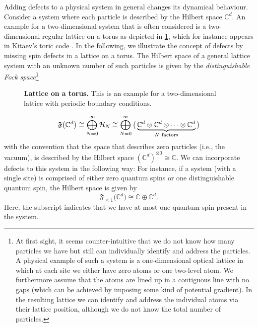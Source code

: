 Adding defects to a physical system in general changes its dynamical behaviour. Consider a system where each particle is described by the Hilbert space $\mathbb{C}^d$. An example for a two-dimensional system that is often considered is a two-dimensional regular lattice on a torus as depicted in \cref{fig:torus}, which for instance appears in Kitaev's toric code \cite{Kitaev2003}. In the following, we illustrate the concept of defects by missing spin defects in a lattice on a torus. The Hilbert space of a general lattice system with an unknown number of such particles is given by the \emph{distinguishable Fock space}\footnote{At first sight, it seems counter-intuitive that we do not know how many particles we have but still can individually identify and address the particles. A physical example of such a system is a one-dimensional optical lattice in which at each site we either have zero atoms or one two-level atom. We furthermore assume that the atoms are lined up in a contiguous line with no gaps (which can be achieved by imposing some kind of potential gradient). In the resulting lattice we can identify and address the individual atoms via their lattice position, although we do not know the total number of particles.}

\begin{figure}[t]
	\centering
	\caption{\small \label{fig:torus}\textbf{Lattice on a torus.} This is an example for a two-dimensional lattice with periodic boundary conditions.}
\end{figure}

\begin{equation}
\mathfrak{F}\big(\mathbb{C}^d\big)\cong\bigoplus_{N=0}^\infty\Hi_N\cong\bigoplus_{N=0}^\infty\big(\underbrace{\mathbb{C}^d\otimes\mathbb{C}^d\otimes\dots\otimes\mathbb{C}^d}_{N\ \mathrm{factors}}\big)
\end{equation}
with the convention that the space that describes zero particles (i.e., the vacuum), is described by the Hilbert space  $(\mathbb{C}^d)^{\otimes 0}\cong\mathbb{C}$. We can incorporate defects to this system in the following way: For instance, if a system (with a single site) is comprised of either zero quantum spins or one distinguishable quantum spin, the Hilbert space is given by
\begin{equation}
\label{eq:Fockone}
\mathfrak{F}_{\le 1}\big(\mathbb{C}^d\big)\cong\mathbb{C}\oplus\mathbb{C}^d.
\end{equation}
Here, the subscript indicates that we have at most one quantum spin present in the system. 

